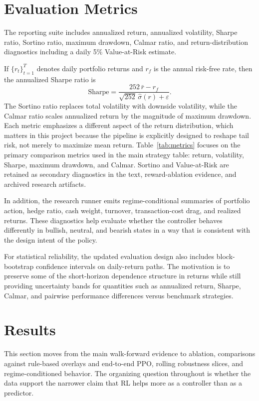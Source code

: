 \documentclass[10pt,twocolumn]{article}
\begin{document}
\section{Evaluation Metrics}

The reporting suite includes annualized return, annualized volatility, Sharpe
ratio, Sortino ratio, maximum drawdown, Calmar ratio, and return-distribution
diagnostics including a daily 5\% Value-at-Risk estimate.

If $\{r_t\}_{t=1}^T$ denotes daily portfolio returns and $r_f$ is the annual
risk-free rate, then the annualized Sharpe ratio is
\[
\text{Sharpe} = \frac{252 \, \bar{r} - r_f}{\sqrt{252}\,\hat{\sigma}(r) + \varepsilon}.
\]
The Sortino ratio replaces total volatility with downside volatility, while the
Calmar ratio scales annualized return by the magnitude of maximum drawdown. Each
metric emphasizes a different aspect of the return distribution, which matters in
this project because the pipeline is explicitly designed to reshape tail risk,
not merely to maximize mean return.
Table~\ref{tab:metrics} focuses on the primary comparison metrics used in the
main strategy table: return, volatility, Sharpe, maximum drawdown, and Calmar.
Sortino and Value-at-Risk are retained as secondary diagnostics in the text,
reward-ablation evidence, and archived research artifacts.

In addition, the research runner emits regime-conditional summaries of
portfolio action, hedge ratio, cash weight, turnover, transaction-cost drag, and
realized returns. These diagnostics help evaluate whether the controller
behaves differently in bullish, neutral, and bearish states in a way that is
consistent with the design intent of the policy.

For statistical reliability, the updated evaluation design also includes
block-bootstrap confidence intervals on daily-return paths. The motivation is to
preserve some of the short-horizon dependence structure in returns while still
providing uncertainty bands for quantities such as annualized return, Sharpe,
Calmar, and pairwise performance differences versus benchmark strategies.

\section{Results}

This section moves from the main walk-forward evidence to ablation, comparisons
against rule-based overlays and end-to-end PPO, rolling robustness slices, and
regime-conditioned behavior. The organizing question throughout is whether the
data support the narrower claim that RL helps more as a controller than as a
predictor.
\end{document}
